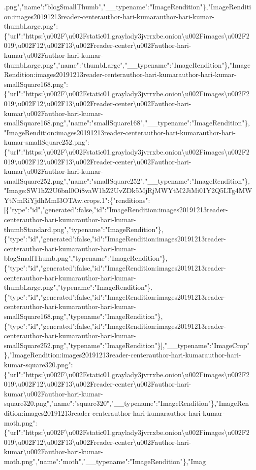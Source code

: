 .png","name":"blogSmallThumb","\_\_typename":"ImageRendition"\},"ImageRendition:images20191213reader-centerauthor-hari-kumarauthor-hari-kumar-thumbLarge.png":\{"url":"https:\textbackslash{}u002F\textbackslash{}u002Fstatic01.graylady3jvrrxbe.onion\textbackslash{}u002Fimages\textbackslash{}u002F2019\textbackslash{}u002F12\textbackslash{}u002F13\textbackslash{}u002Freader-center\textbackslash{}u002Fauthor-hari-kumar\textbackslash{}u002Fauthor-hari-kumar-thumbLarge.png","name":"thumbLarge","\_\_typename":"ImageRendition"\},"ImageRendition:images20191213reader-centerauthor-hari-kumarauthor-hari-kumar-smallSquare168.png":\{"url":"https:\textbackslash{}u002F\textbackslash{}u002Fstatic01.graylady3jvrrxbe.onion\textbackslash{}u002Fimages\textbackslash{}u002F2019\textbackslash{}u002F12\textbackslash{}u002F13\textbackslash{}u002Freader-center\textbackslash{}u002Fauthor-hari-kumar\textbackslash{}u002Fauthor-hari-kumar-smallSquare168.png","name":"smallSquare168","\_\_typename":"ImageRendition"\},"ImageRendition:images20191213reader-centerauthor-hari-kumarauthor-hari-kumar-smallSquare252.png":\{"url":"https:\textbackslash{}u002F\textbackslash{}u002Fstatic01.graylady3jvrrxbe.onion\textbackslash{}u002Fimages\textbackslash{}u002F2019\textbackslash{}u002F12\textbackslash{}u002F13\textbackslash{}u002Freader-center\textbackslash{}u002Fauthor-hari-kumar\textbackslash{}u002Fauthor-hari-kumar-smallSquare252.png","name":"smallSquare252","\_\_typename":"ImageRendition"\},"Image:SW1hZ2U6bnl0Oi8vaW1hZ2UvZDk5MjRjMWYtM2JiMi01Y2Q5LTg4MWYtNmRiYjdhMmI3OTAw.crops.1":\{"renditions":{[}\{"type":"id","generated":false,"id":"ImageRendition:images20191213reader-centerauthor-hari-kumarauthor-hari-kumar-thumbStandard.png","typename":"ImageRendition"\},\{"type":"id","generated":false,"id":"ImageRendition:images20191213reader-centerauthor-hari-kumarauthor-hari-kumar-blogSmallThumb.png","typename":"ImageRendition"\},\{"type":"id","generated":false,"id":"ImageRendition:images20191213reader-centerauthor-hari-kumarauthor-hari-kumar-thumbLarge.png","typename":"ImageRendition"\},\{"type":"id","generated":false,"id":"ImageRendition:images20191213reader-centerauthor-hari-kumarauthor-hari-kumar-smallSquare168.png","typename":"ImageRendition"\},\{"type":"id","generated":false,"id":"ImageRendition:images20191213reader-centerauthor-hari-kumarauthor-hari-kumar-smallSquare252.png","typename":"ImageRendition"\}{]},"\_\_typename":"ImageCrop"\},"ImageRendition:images20191213reader-centerauthor-hari-kumarauthor-hari-kumar-square320.png":\{"url":"https:\textbackslash{}u002F\textbackslash{}u002Fstatic01.graylady3jvrrxbe.onion\textbackslash{}u002Fimages\textbackslash{}u002F2019\textbackslash{}u002F12\textbackslash{}u002F13\textbackslash{}u002Freader-center\textbackslash{}u002Fauthor-hari-kumar\textbackslash{}u002Fauthor-hari-kumar-square320.png","name":"square320","\_\_typename":"ImageRendition"\},"ImageRendition:images20191213reader-centerauthor-hari-kumarauthor-hari-kumar-moth.png":\{"url":"https:\textbackslash{}u002F\textbackslash{}u002Fstatic01.graylady3jvrrxbe.onion\textbackslash{}u002Fimages\textbackslash{}u002F2019\textbackslash{}u002F12\textbackslash{}u002F13\textbackslash{}u002Freader-center\textbackslash{}u002Fauthor-hari-kumar\textbackslash{}u002Fauthor-hari-kumar-moth.png","name":"moth","\_\_typename":"ImageRendition"\},"Imag